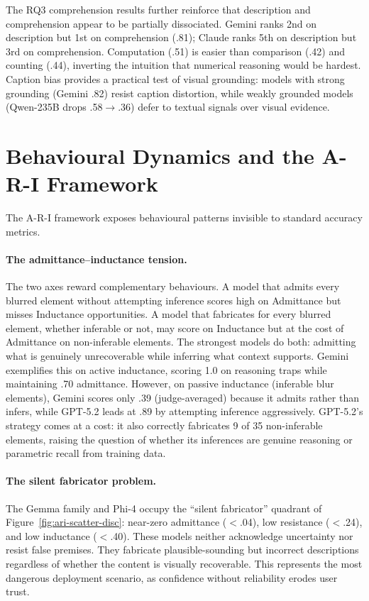 The RQ3 comprehension results further reinforce that description and comprehension appear to be partially dissociated.
Gemini ranks 2nd on description but 1st on comprehension (.81); Claude ranks 5th on description but 3rd on comprehension.
Computation (.51) is easier than comparison (.42) and counting (.44), inverting the intuition that numerical reasoning would be hardest.
Caption bias provides a practical test of visual grounding: models with strong grounding (Gemini .82) resist caption distortion, while weakly grounded models (Qwen-235B drops .58$\to$.36) defer to textual signals over visual evidence.

\section{Behavioural Dynamics and the A-R-I Framework}\label{sec:disc-ari}

The A-R-I framework exposes behavioural patterns invisible to standard accuracy metrics.

\paragraph{The admittance--inductance tension.}
The two axes reward complementary behaviours.
A model that admits every blurred element without attempting inference scores high on Admittance but misses Inductance opportunities.
A model that fabricates for every blurred element, whether inferable or not, may score on Inductance but at the cost of Admittance on non-inferable elements.
The strongest models do both: admitting what is genuinely unrecoverable while inferring what context supports.
Gemini exemplifies this on active inductance, scoring 1.0 on reasoning traps while maintaining .70 admittance.
However, on passive inductance (inferable blur elements), Gemini scores only .39 (judge-averaged) because it admits rather than infers, while GPT-5.2 leads at .89 by attempting inference aggressively.
GPT-5.2's strategy comes at a cost: it also correctly fabricates 9 of 35 non-inferable elements, raising the question of whether its inferences are genuine reasoning or parametric recall from training data.

\paragraph{The silent fabricator problem.}
The Gemma family and Phi-4 occupy the ``silent fabricator'' quadrant of Figure~\ref{fig:ari-scatter-disc}: near-zero admittance ($<$.04), low resistance ($<$.24), and low inductance ($<$.40).
These models neither acknowledge uncertainty nor resist false premises.
They fabricate plausible-sounding but incorrect descriptions regardless of whether the content is visually recoverable.
This represents the most dangerous deployment scenario, as confidence without reliability erodes user trust.

